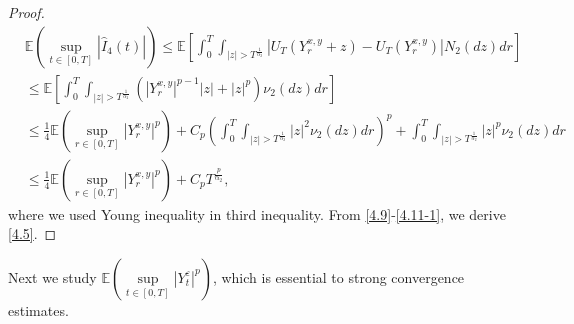 \documentclass[11pt,reqno]{amsart}
\numberwithin{equation}{section}
\begin{document}
\begin{proof}
\begin{equation}
	\begin{split}
		&\mathbb{E}\left(\sup_{t\in [0,T]} |\hat{I}_{4}(t)|\right)\leq \mathbb{E}\left[ \int_{0}^{T} \int_{|z|> T^{\frac{1}{\alpha_{2}}}}\left|  U_{T}(Y_{r}^{ x,y}+z)-U_{T}(Y_{r}^{ x,y}) \right|  N_{2}(dz)dr\right] \\
		&\leq \mathbb{E}\left[ \int_{0}^{T} \int_{|z|>T^{\frac{1}{\alpha_{2}}}}\left( \left| Y_{r}^{ x,y}  \right|^{p-1}|z|+|z|^{p} \right)  \nu_{2}(dz)dr\right]\\
		&\leq \frac{1}{4}\mathbb{E} \left(\sup_{r\in [0,T]} |Y_{r}^{ x,y}|^{p}\right)+C_{p}\left(\int_{0}^{T} \int_{|z|>T^{\frac{1}{\alpha_{2}}}} |z|^{2}  \nu_{2}(dz)dr\right) ^{p}+\int_{0}^{T} \int_{|z|> T^{\frac{1}{\alpha_{2}}}} |z|^{p}  \nu_{2}(dz)dr\\
		&\leq \frac{1}{4}\mathbb{E} \left(\sup_{r\in [0,T]} |Y_{r}^{ x,y}|^{p}\right)+C_{p}T^{\frac{p}{\alpha_{2}}},
	\end{split}
	\end{equation}
	where we used Young inequality in third inequality. From \eqref{4.9}-\eqref{4.11-1}, we derive \eqref{4.5}.
\end{proof}


Next we study $\mathbb{E}\left(\underset{t\in [0,T]}{\sup} |Y_{t}^{\varepsilon}|^{p}\right)$, which is essential to strong convergence estimates.
\end{document}
